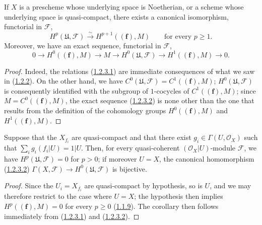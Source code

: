 \begin{proposition}[1.2.3]
\label{III.1.2.3}
If $X$ is a prescheme whose underlying space is Noetherian, or a
scheme whose underlying space is quasi-compact, there exists a canonical
isomorphism, functorial in $\mathcal F$,
\begin{equation}
\label{III.1.2.3.1}
\tag{1.2.3.1}
H^p(\mathfrak U,\mathcal F)\xrightarrow{\sim}H^{p+1}((\mathbf f),M)
\qquad\text{for every }p\geq1.
\end{equation}
Moreover, we have an exact sequence, functorial in $\mathcal F$,
\begin{equation}
\label{III.1.2.3.2}
\tag{1.2.3.2}
0\longrightarrow H^0((\mathbf f),M)\longrightarrow M
\longrightarrow H^0(\mathfrak U,\mathcal F)
\longrightarrow H^1((\mathbf f),M)\longrightarrow0.
\end{equation}
\end{proposition}

\begin{proof}
Indeed, the relations (\hyperref[III.1.2.3.1]{1.2.3.1}) are immediate
consequences of what we saw in (\hyperref[III.1.2.2]{1.2.2}). On the
other hand, we have
$C^0(\mathfrak U,\mathcal F)=C^1((\mathbf f),M)$;
$H^0(\mathfrak U,\mathcal F)$ is consequently identified with the subgroup of
$1$-cocycles of $C^1((\mathbf f),M)$; since
$M=C^0((\mathbf f),M)$, the exact sequence
(\hyperref[III.1.2.3.2]{1.2.3.2}) is none other than the one that results
from the definition of the cohomology groups $H^0((\mathbf f),M)$ and
$H^1((\mathbf f),M)$.
\end{proof}

\begin{corollary}[1.2.4]
\label{III.1.2.4}
Suppose that the $X_{f_i}$ are quasi-compact and that there exist
$g_i\in\Gamma(U,\mathcal O_X)$ such that
$\sum_i g_i(f_i\vert U)=1\vert U$. Then, for every quasi-coherent
$(\mathcal O_X\vert U)$-module $\mathcal F$, we have
$H^p(\mathfrak U,\mathcal F)=0$ for $p>0$; if moreover $U=X$,
the canonical homomorphism \textup{(\hyperref[III.1.2.3.2]{1.2.3.2})}
$\Gamma(X,\mathcal F)\to H^0(\mathfrak U,\mathcal F)$ is bijective.
\end{corollary}

\begin{proof}
Since the $U_i=X_{f_i}$ are quasi-compact by hypothesis, so is $U$, and we
may therefore restrict to the case where $U=X$; the hypothesis then implies
$H^p((\mathbf f),M)=0$ for every $p\geq0$
(\hyperref[III.1.1.9]{1.1.9}). The corollary then follows immediately from
(\hyperref[III.1.2.3.1]{1.2.3.1}) and
(\hyperref[III.1.2.3.2]{1.2.3.2}).
\end{proof}

